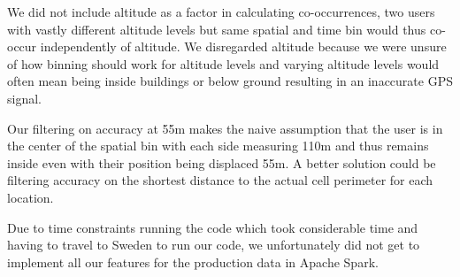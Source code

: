 We did not include altitude as a factor in calculating co-occurrences, two users with vastly different altitude levels but same spatial and time bin would thus co-occur independently of altitude. We disregarded altitude because we were unsure of how binning should work for altitude levels and varying altitude levels would often mean being inside buildings or below ground resulting in an inaccurate GPS signal.

Our filtering on accuracy at 55m makes the naive assumption that the user is in the center of the spatial bin with each side measuring 110m and thus remains inside even with their position being displaced 55m. A better solution could be filtering accuracy on the shortest distance to the actual cell perimeter for each location.

Due to time constraints running the code which took considerable time and having to travel to Sweden to run our code, we unfortunately did not get to implement all our features for the production data in Apache Spark.